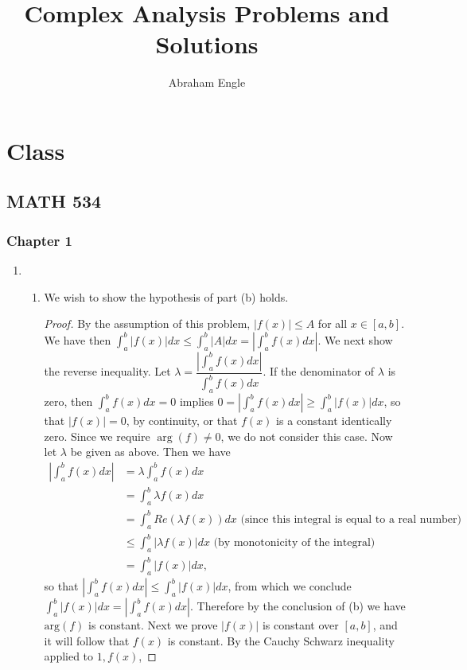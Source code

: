 \documentclass[11pt]{book}
\theoremstyle{definition}
\begin{document}
\title{Complex Analysis Problems and Solutions}
\author{Abraham Engle}
\maketitle
\tableofcontents
\chapter{Class}
\section{MATH 534}
\subsection{Chapter 1}
\begin{enumerate}
\item
\begin{enumerate}
\item We wish to show the hypothesis of part (b) holds.
\begin{proof}
By the assumption of this problem, $|f(x)|\leq A$ for all $x\in[a,b]$. We have then
$\int_a^b |f(x)|dx\leq \int_a^b |A|dx = \left|\int_a^b f(x)dx\right|$. We next show the reverse inequality. Let $\lambda = \dfrac{|\int_a^bf(x)dx|}{\int_a^bf(x)dx}$. If the denominator of $\lambda$ is zero, then $\int_a^b f(x)dx=0$ implies $0=\left|\int_a^b f(x)dx\right|\geq\int_a^b |f(x)|dx$, so that $|f(x)|=0$, by continuity, or that $f(x)$ is a constant identically zero. Since we require $\arg(f)\neq 0$, we do not consider this case. Now let $\lambda$ be given as above. Then we have
\begin{align*}
\left|\int_a^b f(x)dx\right| &= \lambda\int_a^b f(x)dx \\
&= \int_a^b \lambda f(x)dx \\
&= \int_a^b Re(\lambda f(x))dx \text{ (since this integral is equal to a real number)} \\
&\leq \int_a^b |\lambda f(x)|dx \text{ (by monotonicity of the integral)} \\
&= \int_a^b |f(x)|dx,
\end{align*}
so that $\left|\int_a^b f(x)dx\right|\leq \int_a^b |f(x)|dx$, from which we conclude $\int_a^b|f(x)|dx=\left|\int_a^bf(x)dx\right|$. Therefore by the conclusion of (b) we have $\mathrm{arg}(f)$ is constant. Next we prove $|f(x)|$ is constant over $[a,b]$, and it will follow that $f(x)$ is constant. By the Cauchy Schwarz inequality applied to $1, f(x)$,

\end{proof}
\end{enumerate}
\end{enumerate}
\end{document}
